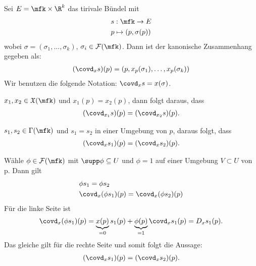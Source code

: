 \begin{bsp}
Sei $E = \mfk \times \R^k$ das tirivale Bündel mit
\begin{align}
&s: \mfk \to E \\
&p \mapsto (p, \sigma(p))
\end{align}
wobei $\sigma = (\sigma_1, \dots, \sigma_k)$, $\sigma_i \in \mathcal{F}(\mfk)$.
Dann ist der kanonische Zusammenhang gegeben als:
\begin{align}
(\covd_x s)(p) = (p, x_p(\sigma_1), \dots, x_p(\sigma_k))
\end{align}
Wir benutzen die folgende Notation: $\covd_x s = x(\sigma)$.
\end{bsp}

\begin{lem}
\label{lem:lokalisierung1}
$x_1, x_2 \in \mathfrak{X}(\mfk)$ und $x_1(p) = x_2(p)$,
dann folgt daraus, dass 
\begin{align}
(\covd_{x_1} s)(p) = (\covd_{x_2} s) (p).
\end{align}

\end{lem}

\begin{lem}
\label{lem:lokalisierung2}
$s_1, s_2 \in \Gamma(\mfk)$ und $s_1 = s_2$ in einer Umgebung von $p$,
daraus folgt, dass
\begin{align}
(\covd_{x} s_1)(p) = (\covd_{x} s_2) (p).
\end{align}
\end{lem}

\begin{bew}
Wähle $\phi \in \mathcal{F}(\mfk)$ mit $\supp \phi \subseteq U$ und $\phi = 1$ auf einer Umgebung $V \subset U$ von p.
Dann gilt 
\begin{align}
&\phi s_1 = \phi s_2 \\
&\covd_x(\phi s_1)(p) = \covd_x(\phi s_2)(p)
\end{align}
Für die linke Seite ist
\begin{align}
\covd_x(\phi s_1)(p) = \underbrace{x(p)}_{=0} s_1(p) + \underbrace{\phi(p)}_{=1} \covd_x s_1(p) = D_x s_1 (p).
\end{align}
Das gleiche gilt für die rechte Seite und somit folgt die Aussage:
\begin{align}
(\covd_{x} s_1)(p) = (\covd_{x} s_2) (p).
\end{align}
\end{bew}
